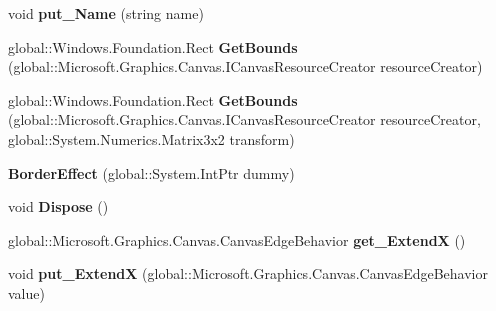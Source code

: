 \begin{DoxyCompactItemize}
void {\bfseries put\+\_\+\+Name} (string name)
\item 
\mbox{\label{class_microsoft_1_1_graphics_1_1_canvas_1_1_effects_1_1_border_effect_ad8bd48d4828136c863ab7e2088fc2448}} 
global\+::\+Windows.\+Foundation.\+Rect {\bfseries Get\+Bounds} (global\+::\+Microsoft.\+Graphics.\+Canvas.\+I\+Canvas\+Resource\+Creator resource\+Creator)
\item 
\mbox{\label{class_microsoft_1_1_graphics_1_1_canvas_1_1_effects_1_1_border_effect_a71d105763b501f2e7bcdb69338ce699c}} 
global\+::\+Windows.\+Foundation.\+Rect {\bfseries Get\+Bounds} (global\+::\+Microsoft.\+Graphics.\+Canvas.\+I\+Canvas\+Resource\+Creator resource\+Creator, global\+::\+System.\+Numerics.\+Matrix3x2 transform)
\item 
\mbox{\label{class_microsoft_1_1_graphics_1_1_canvas_1_1_effects_1_1_border_effect_a2047b145d942967ddaf531f628fd6457}} 
{\bfseries Border\+Effect} (global\+::\+System.\+Int\+Ptr dummy)
\item 
\mbox{\label{class_microsoft_1_1_graphics_1_1_canvas_1_1_effects_1_1_border_effect_a8395460dd5965cd4aacc0875a1c0b680}} 
void {\bfseries Dispose} ()
\item 
\mbox{\label{class_microsoft_1_1_graphics_1_1_canvas_1_1_effects_1_1_border_effect_a9b8cb2410a4d2443829d9eeecfd0733e}} 
global\+::\+Microsoft.\+Graphics.\+Canvas.\+Canvas\+Edge\+Behavior {\bfseries get\+\_\+\+ExtendX} ()
\item 
\mbox{\label{class_microsoft_1_1_graphics_1_1_canvas_1_1_effects_1_1_border_effect_af4f6600839db25402d0fb39ed1fd5542}} 
void {\bfseries put\+\_\+\+ExtendX} (global\+::\+Microsoft.\+Graphics.\+Canvas.\+Canvas\+Edge\+Behavior value)
\item 
\mbox{\label{class_microsoft_1_1_graphics_1_1_canvas_1_1_effects_1_1_border_effect_aa62a4c26a2f87c325e90e8a2ef7348d0}} 

\end{DoxyCompactItemize}
